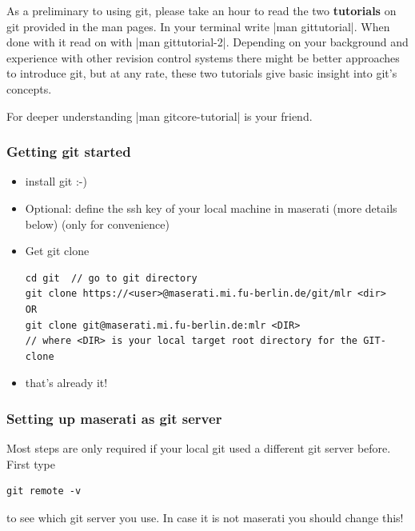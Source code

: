 As a preliminary to using git, please take an hour to read the two
\textbf{tutorials} on git provided in the man pages. In your terminal
write |man gittutorial|. When done with it read on with
|man gittutorial-2|.
Depending on your background and experience with other revision control
systems there might be better approaches to introduce git, but at any
rate, these two tutorials give basic insight into git's concepts.

For deeper understanding |man gitcore-tutorial| is your friend.


\subsubsection{Getting git started}

\begin{itemize}

\item install git :-)

\item Optional: define the ssh key of your local machine in maserati
(more details below) (only for convenience)

\item Get git clone
\begin{code}
\begin{verbatim}
cd git  // go to git directory
git clone https://<user>@maserati.mi.fu-berlin.de/git/mlr <dir>
OR
git clone git@maserati.mi.fu-berlin.de:mlr <DIR>
// where <DIR> is your local target root directory for the GIT-clone
\end{verbatim}
\end{code}

\item that's already it!

\end{itemize}


\subsubsection{Setting up maserati as git server}

Most steps are only required if your local git used a different git
server before.
\\
First type
\begin{verbatim}
git remote -v
\end{verbatim}
to see which git server you use. In case it is not maserati you should
change this!

